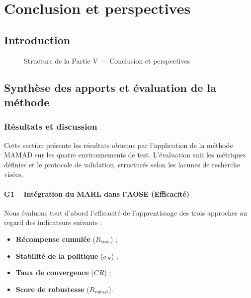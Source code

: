
\cleardoublepage
{}
\part{Conclusion et perspectives}

\chapter*{Introduction}

\begin{figure}[h!]
    \centering
    \resizebox{\linewidth}{!}{%
        
    }
    \caption{Structure de la Partie V — Conclusion et perspectives}
\end{figure}

\chapter{Synthèse des apports et évaluation de la méthode}

\section{Résultats et discussion}
\label{sec:results}

Cette section présente les résultats obtenus par l'application de la méthode MAMAD sur les quatre environnements de test. L'évaluation suit les métriques définies et le protocole de validation, structurés selon les lacunes de recherche visées.

\subsection{G1 – Intégration du MARL dans l'AOSE (Efficacité)}

Nous évaluons tout d'abord l'efficacité de l'apprentissage des trois approches au regard des indicateurs suivants :

\begin{itemize}
    \item \textbf{Récompense cumulée} ($R_{cum}$) ;
    \item \textbf{Stabilité de la politique} ($\sigma_R$) ;
    \item \textbf{Taux de convergence} ($CR$) ;
    \item \textbf{Score de robustesse} ($R_{robust}$).
\end{itemize}

